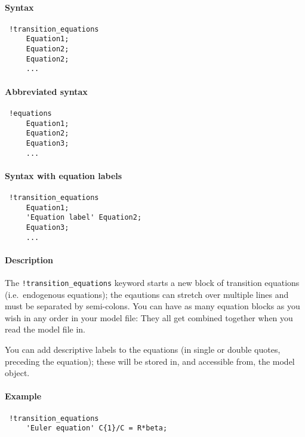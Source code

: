


	\paragraph{Syntax}
 
 \begin{verbatim}
 !transition_equations
     Equation1;
     Equation2;
     Equation2;
     ...
 \end{verbatim}
 
 \paragraph{Abbreviated syntax}
 
 \begin{verbatim}
 !equations
     Equation1;
     Equation2;
     Equation3;
     ...
 \end{verbatim}
 
 \paragraph{Syntax with equation labels}
 
 \begin{verbatim}
 !transition_equations
     Equation1;
     'Equation label' Equation2;
     Equation3;
     ...
 \end{verbatim}
 
 \paragraph{Description}
 
 The \texttt{!transition\_equations} keyword starts a new block of
 transition equations (i.e.~endogenous equations); the eqautions can
 stretch over multiple lines and must be separated by semi-colons. You
 can have as many equation blocks as you wish in any order in your model
 file: They all get combined together when you read the model file in.
 
 You can add descriptive labels to the equations (in single or double
 quotes, preceding the equation); these will be stored in, and accessible
 from, the model object.
 
 \paragraph{Example}
 
 \begin{verbatim}
 !transition_equations
     'Euler equation' C{1}/C = R*beta;
 \end{verbatim}


